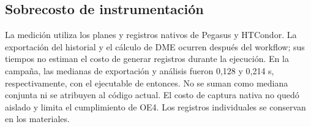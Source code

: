 \subsection{Sobrecosto de instrumentación}
\label{sec:costo_a}
La medición utiliza los planes y registros nativos de Pegasus y HTCondor. La exportación del historial y el cálculo de DME ocurren después del workflow; sus tiempos no estiman el costo de generar registros durante la ejecución. En la campaña, las medianas de exportación y análisis fueron 0,128 y 0,214 s, respectivamente, con el ejecutable de entonces. No se suman como mediana conjunta ni se atribuyen al código actual. El costo de captura nativa no quedó aislado y limita el cumplimiento de OE4. Los registros individuales se conservan en los materiales.

